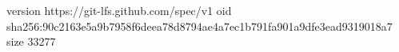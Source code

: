 version https://git-lfs.github.com/spec/v1
oid sha256:90c2163e5a9b7958f6deea78d8794ae4a7ec1b791fa901a9dfe3ead9319018a7
size 33277
